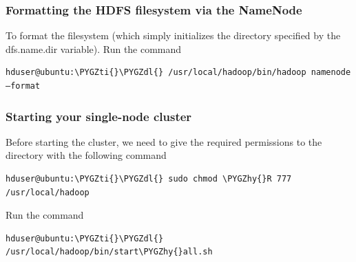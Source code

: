 \documentclass[letterpaper,10pt,english]{sphinxmanual}
\def\PYGZdl{\char`\$}
\def\PYGZhy{\char`\-}
\def\PYGZti{\char`\~}
\begin{document}
\subsubsection{Formatting the HDFS filesystem via the NameNode}
\label{hadoop:formatting-the-hdfs-filesystem-via-the-namenode}
To format the filesystem (which simply initializes the directory specified by the dfs.name.dir variable).
Run the command

\begin{Verbatim}[commandchars=\\\{\}]
hduser@ubuntu:\PYGZti{}\PYGZdl{} /usr/local/hadoop/bin/hadoop namenode –format
\end{Verbatim}
\begin{figure}[htbp]
\centering

\end{figure}


\subsubsection{Starting your single-node cluster}
\label{hadoop:starting-your-single-node-cluster}
Before starting the cluster, we need to give the required permissions to the directory with the following command

\begin{Verbatim}[commandchars=\\\{\}]
hduser@ubuntu:\PYGZti{}\PYGZdl{} sudo chmod \PYGZhy{}R 777 /usr/local/hadoop
\end{Verbatim}

Run the command

\begin{Verbatim}[commandchars=\\\{\}]
hduser@ubuntu:\PYGZti{}\PYGZdl{} /usr/local/hadoop/bin/start\PYGZhy{}all.sh
\end{Verbatim}
\end{document}
